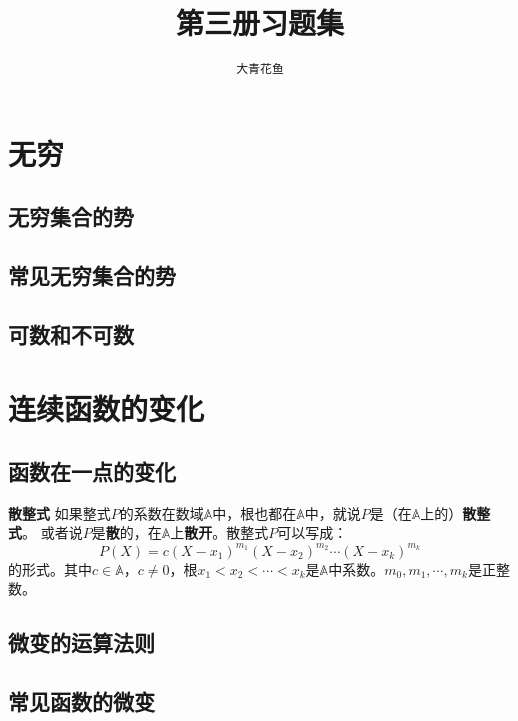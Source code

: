 \documentclass[12pt,UTF8]{ctexbook}
\title{\zihao{0} \bfseries 第三册习题集}
\author{\zihao{2} \texttt{大青花鱼}}
\date{}
\begin{document}
\maketitle
\tableofcontents
\newpage

\chapter{无穷}

\section{无穷集合的势}

\section{常见无穷集合的势}

\section{可数和不可数}

\chapter{连续函数的变化}

\section{函数在一点的变化}

\begin{df}{\textbf{散整式}}
    如果整式$P$的系数在数域$\mathbb{A}$中，根也都在$\mathbb{A}$中，就说$P$是（在$\mathbb{A}$上的）\textbf{散整式}。
    或者说$P$是\textbf{散}的，在$\mathbb{A}$上\textbf{散开}。散整式$P$可以写成：
    $$P(X) = c(X - x_1)^{m_1}(X - x_2)^{m_2}\cdots(X - x_k)^{m_k}$$
    的形式。其中$c\in \mathbb{A}$，$c\neq 0$，根$x_1 < x_2 < \cdots < x_k$是$\mathbb{A}$中系数。$m_0, m_1, \cdots, m_k$是正整数。
    
\end{df}

\section{微变的运算法则}

\section{常见函数的微变}
\end{document}
